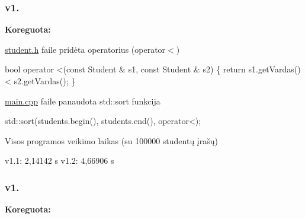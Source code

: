 \subsubsection*{v1.}

{\bfseries Koreguota\+:}


\begin{DoxyItemize}
\item {\ttfamily \hyperlink{student_8h}{student.\+h}} faile pridėta operatorius (operator$<$) 
\begin{DoxyCode}
bool operator <(const Student & s1, const Student & s2)
\{
    return s1.getVardas() < s2.getVardas();
\}
\end{DoxyCode}

\item {\ttfamily \hyperlink{main_8cpp_source}{main.\+cpp}} faile panaudota {\ttfamily std\+::sort} funkcija 
\begin{DoxyCode}
std::sort(students.begin(), students.end(), operator<);
\end{DoxyCode}

\item Visos programos veikimo laikas (su 100000 studentų įrašų) 
\begin{DoxyCode}
v1.1: 2,14142 s
v1.2: 4,66906 s
\end{DoxyCode}

\end{DoxyItemize}

\subsubsection*{v1.}

{\bfseries Koreguota\+:}


